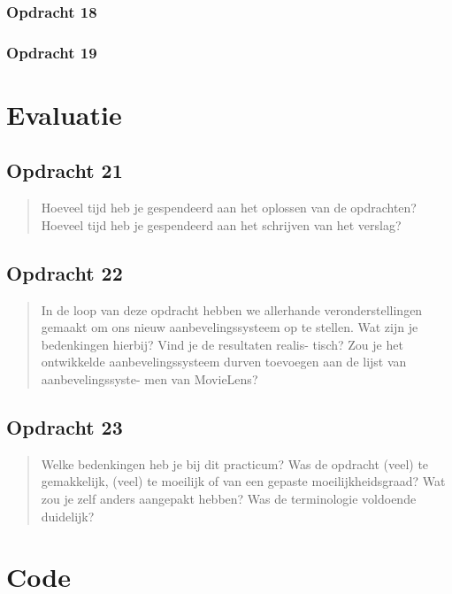 \documentclass[11pt, a4paper, titlepage, openright]{article}
\begin{document}
	\subsubsection{Opdracht 18}

	\subsubsection{Opdracht 19}
		
		
\section{Evaluatie}
	
	\subsection{Opdracht 21}
		\begin{quote}
			Hoeveel tijd heb je gespendeerd aan het oplossen van de opdrachten? 
			Hoeveel tijd heb je gespendeerd aan het schrijven van het verslag?
		\end{quote}
		\noindent 
	
	\subsection{Opdracht 22}
		\begin{quote}
			In de loop van deze opdracht hebben we allerhande veronderstellingen gemaakt om ons
nieuw aanbevelingssysteem op te stellen. Wat zijn je bedenkingen hierbij? Vind je de resultaten realis-
tisch? Zou je het ontwikkelde aanbevelingssysteem durven toevoegen aan de lijst van aanbevelingssyste-
men van MovieLens?
		\end{quote}
		
		
	
	\subsection{Opdracht 23}
		\begin{quote}
			Welke bedenkingen heb je bij dit practicum? Was de opdracht (veel) te gemakkelijk, (veel) te moeilijk of 
			van een gepaste moeilijkheidsgraad? Wat zou je zelf anders aangepakt hebben?  Was de terminologie voldoende duidelijk?
		\end{quote}
		
		
	

\onecolumn
\appendix
\appendixpage
\addappheadtotoc

\section{Code}
\end{document}
